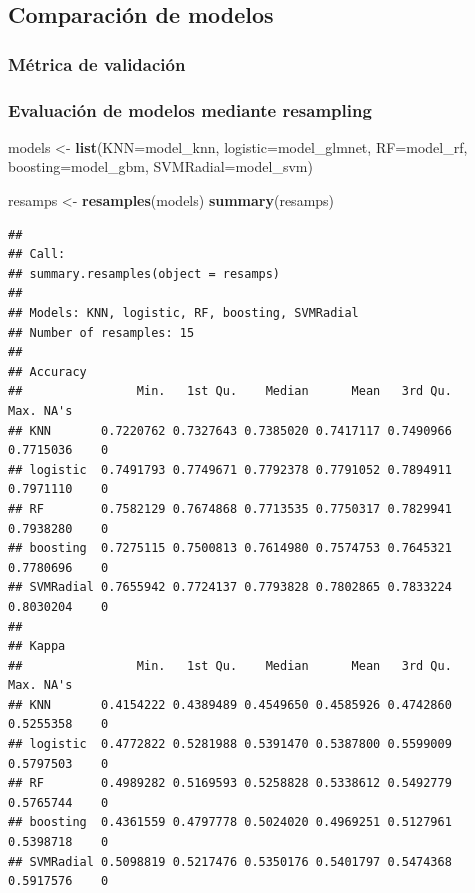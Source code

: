 \documentclass[
]{article}
\newenvironment{Shaded}{\begin{snugshade}}{\end{snugshade}}
\newcommand{\DataTypeTok}[1]{\textcolor[rgb]{0.13,0.29,0.53}{#1}}
\newcommand{\KeywordTok}[1]{\textcolor[rgb]{0.13,0.29,0.53}{\textbf{#1}}}
\newcommand{\NormalTok}[1]{#1}
\newcommand{\StringTok}[1]{\textcolor[rgb]{0.31,0.60,0.02}{#1}}
\begin{document}
\hypertarget{comparaciuxf3n-de-modelos}{%
\subsection{Comparación de modelos}\label{comparaciuxf3n-de-modelos}}

\hypertarget{muxe9trica-de-validaciuxf3n}{%
\subsubsection{Métrica de
validación}\label{muxe9trica-de-validaciuxf3n}}

\hypertarget{evaluaciuxf3n-de-modelos-mediante-resampling}{%
\subsubsection{Evaluación de modelos mediante
resampling}\label{evaluaciuxf3n-de-modelos-mediante-resampling}}

\begin{Shaded}
\begin{Highlighting}[]
\NormalTok{models <-}\StringTok{ }\KeywordTok{list}\NormalTok{(}\DataTypeTok{KNN=}\NormalTok{model_knn, }\DataTypeTok{logistic=}\NormalTok{model_glmnet,}
               \DataTypeTok{RF=}\NormalTok{model_rf, }\DataTypeTok{boosting=}\NormalTok{model_gbm, }\DataTypeTok{SVMRadial=}\NormalTok{model_svm)}

\NormalTok{resamps <-}\StringTok{ }\KeywordTok{resamples}\NormalTok{(models)}
\KeywordTok{summary}\NormalTok{(resamps)}
\end{Highlighting}
\end{Shaded}

\begin{verbatim}
## 
## Call:
## summary.resamples(object = resamps)
## 
## Models: KNN, logistic, RF, boosting, SVMRadial 
## Number of resamples: 15 
## 
## Accuracy 
##                Min.   1st Qu.    Median      Mean   3rd Qu.      Max. NA's
## KNN       0.7220762 0.7327643 0.7385020 0.7417117 0.7490966 0.7715036    0
## logistic  0.7491793 0.7749671 0.7792378 0.7791052 0.7894911 0.7971110    0
## RF        0.7582129 0.7674868 0.7713535 0.7750317 0.7829941 0.7938280    0
## boosting  0.7275115 0.7500813 0.7614980 0.7574753 0.7645321 0.7780696    0
## SVMRadial 0.7655942 0.7724137 0.7793828 0.7802865 0.7833224 0.8030204    0
## 
## Kappa 
##                Min.   1st Qu.    Median      Mean   3rd Qu.      Max. NA's
## KNN       0.4154222 0.4389489 0.4549650 0.4585926 0.4742860 0.5255358    0
## logistic  0.4772822 0.5281988 0.5391470 0.5387800 0.5599009 0.5797503    0
## RF        0.4989282 0.5169593 0.5258828 0.5338612 0.5492779 0.5765744    0
## boosting  0.4361559 0.4797778 0.5024020 0.4969251 0.5127961 0.5398718    0
## SVMRadial 0.5098819 0.5217476 0.5350176 0.5401797 0.5474368 0.5917576    0
\end{verbatim}
\end{document}
